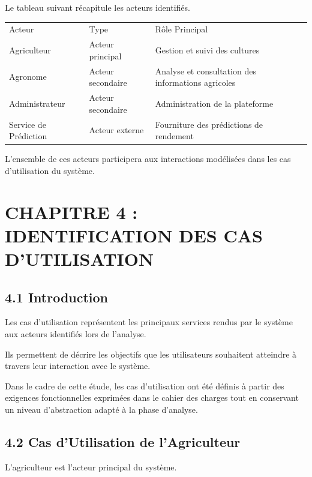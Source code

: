 \documentclass[
]{book}
\begin{document}
Le tableau suivant récapitule les acteurs identifiés.

\begin{longtable}[]{@{}lll@{}}
\toprule
\endhead
Acteur & Type & Rôle Principal \\
Agriculteur & Acteur principal & Gestion et suivi des cultures \\
Agronome & Acteur secondaire & Analyse et consultation des informations
agricoles \\
Administrateur & Acteur secondaire & Administration de la plateforme \\
Service de Prédiction & Acteur externe & Fourniture des prédictions de
rendement \\
\bottomrule
\end{longtable}

L'ensemble de ces acteurs participera aux interactions modélisées dans
les cas d'utilisation du système.

\hypertarget{chapitre-4-identification-des-cas-dutilisation}{%
\chapter{CHAPITRE 4 : IDENTIFICATION DES CAS
D'UTILISATION}\label{chapitre-4-identification-des-cas-dutilisation}}

\hypertarget{introduction-1}{%
\section{4.1 Introduction}\label{introduction-1}}

Les cas d'utilisation représentent les principaux services rendus par le
système aux acteurs identifiés lors de l'analyse.

Ils permettent de décrire les objectifs que les utilisateurs souhaitent
atteindre à travers leur interaction avec le système.

Dans le cadre de cette étude, les cas d'utilisation ont été définis à
partir des exigences fonctionnelles exprimées dans le cahier des charges
tout en conservant un niveau d'abstraction adapté à la phase d'analyse.

\hypertarget{cas-dutilisation-de-lagriculteur}{%
\section{4.2 Cas d'Utilisation de
l'Agriculteur}\label{cas-dutilisation-de-lagriculteur}}

L'agriculteur est l'acteur principal du système.
\end{document}
